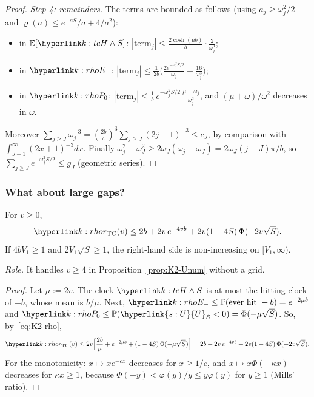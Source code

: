 \documentclass[11pt]{article}
\DeclareRobustCommand{\sy}[2]{{\hyperlink{#1}{#2}}}
\newcommand{\E}{\mathbb{E}}
\renewcommand{\P}{\mathbb{P}}
\newcommand{\1}{\mathbf{1}}
\newcommand{\Ud}{\sy{s:U}{U}}
\begin{document}
\begin{proof}
\textit{Step 4: remainders.} The terms are bounded as follows (using $a_j\ge\omega_j^2/2$ and $\varrho(a)\le e^{-aS}/a+4/a^2$):
\begin{itemize}
\item in $\E[\kH\wedge S]$: $|\text{term}_j|\le\frac{2\cosh(\mu b)}b\cdot\frac{2}{\omega_j^3}$;
\item in $\kEm$: $|\text{term}_j|\le\frac1{2b}\big(\frac{2e^{-\omega_j^2S/2}}{\omega_j}+\frac{16}{\omega_j^3}\big)$;
\item in $\kPo$: $|\text{term}_j|\le\frac1b\,e^{-\omega_j^2S/2}\,\frac{\mu+\omega_j}{\omega_j^2}$, and $(\mu+\omega)/\omega^2$ decreases in $\omega$.
\end{itemize}
Moreover $\sum_{j\ge J}\omega_j^{-3}=(\frac{2b}\pi)^3\sum_{j\ge J}(2j+1)^{-3}\le c_J$, by comparison with $\int_{J-1}^\infty(2x+1)^{-3}dx$. Finally
$\omega_j^2-\omega_J^2\ge2\omega_J(\omega_j-\omega_J)=2\omega_J(j-J)\pi/b$, so $\sum_{j\ge J}e^{-\omega_j^2S/2}\le g_J$ (geometric series).
\end{proof}

\subsubsection{What about large gaps?}

\begin{lemma}\label{lem:K2-tail}
For $v\ge0$,
\[
\kr(v)\le2b+2v\,e^{-4vb}+2v(1-4S)\,\Phi(-2v\sqrt S).
\]
If $4bV_1\ge1$ and $2V_1\sqrt S\ge1$, the right-hand side is non-increasing on $[V_1,\infty)$.
\end{lemma}
\noindent\textit{Role.} It handles $v\ge4$ in Proposition~\ref{prop:K2-Unum} without a grid.
\begin{proof}
Let $\mu:=2v$. The clock $\kH\wedge S$ is at most the hitting clock of $+b$, whose mean is $b/\mu$. Next, $\kEm\le\P(\text{ever hit }-b)=e^{-2\mu b}$ and
$\kPo\le\P(\Ud_S<0)=\Phi(-\mu\sqrt S)$. So, by~\eqref{eq:K2-rho},
\[
\kr(v)\le2v\Big[\frac{2b}{\mu}+e^{-2\mu b}+(1-4S)\,\Phi(-\mu\sqrt S)\Big]=2b+2v\,e^{-4vb}+2v(1-4S)\,\Phi(-2v\sqrt S).
\]
For the monotonicity: $x\mapsto xe^{-cx}$ decreases for $x\ge1/c$, and $x\mapsto x\Phi(-\kappa x)$ decreases for $\kappa x\ge1$, because
$\Phi(-y)<\varphi(y)/y\le y\varphi(y)$ for $y\ge1$ (Mills' ratio).
\end{proof}
\end{document}
